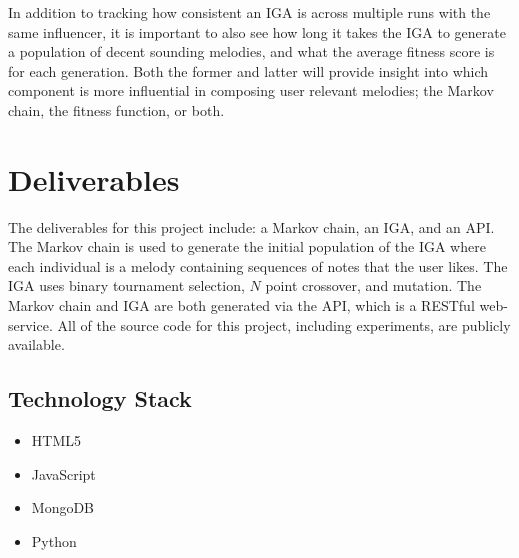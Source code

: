 \documentclass[12pt]{article} %
\begin{document}
In addition to tracking how consistent an IGA is across multiple runs with the same influencer, it is important to also see how long it takes the IGA to generate a population of decent sounding melodies, and what the average fitness score is for each generation. Both the former and latter will provide insight into which component is more influential in composing user relevant melodies; the Markov chain, the fitness function, or both.\\


\section{Deliverables}
The deliverables for this project include: a Markov chain, an IGA, and an API. The Markov chain is used to generate the initial population of the IGA where each individual is a melody containing sequences of notes that the user likes. The IGA uses binary tournament selection, $N$ point crossover, and mutation. The Markov chain and IGA are both generated via the API, which is a RESTful web-service. All of the source code for this project, including experiments, are publicly available.

\subsection{Technology Stack}
\begin{itemize}
	\item HTML5	
	\item JavaScript
	\item MongoDB
	\item Python
\end{itemize}




\end{document}
